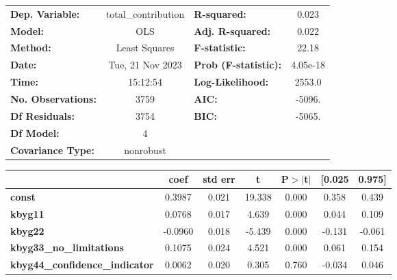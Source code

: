 \begin{center}
\begin{tabular}{lclc}
\toprule
\textbf{Dep. Variable:}                & total\_contribution & \textbf{  R-squared:         } &     0.023   \\
\textbf{Model:}                        &         OLS         & \textbf{  Adj. R-squared:    } &     0.022   \\
\textbf{Method:}                       &    Least Squares    & \textbf{  F-statistic:       } &     22.18   \\
\textbf{Date:}                         &   Tue, 21 Nov 2023  & \textbf{  Prob (F-statistic):} &  4.05e-18   \\
\textbf{Time:}                         &       15:12:54      & \textbf{  Log-Likelihood:    } &    2553.0   \\
\textbf{No. Observations:}             &          3759       & \textbf{  AIC:               } &    -5096.   \\
\textbf{Df Residuals:}                 &          3754       & \textbf{  BIC:               } &    -5065.   \\
\textbf{Df Model:}                     &             4       & \textbf{                     } &             \\
\textbf{Covariance Type:}              &      nonrobust      & \textbf{                     } &             \\
\bottomrule
\end{tabular}
\begin{tabular}{lcccccc}
                                       & \textbf{coef} & \textbf{std err} & \textbf{t} & \textbf{P$> |$t$|$} & \textbf{[0.025} & \textbf{0.975]}  \\
\midrule
\textbf{const}                         &       0.3987  &        0.021     &    19.338  &         0.000        &        0.358    &        0.439     \\
\textbf{kbyg11}                        &       0.0768  &        0.017     &     4.639  &         0.000        &        0.044    &        0.109     \\
\textbf{kbyg22}                        &      -0.0960  &        0.018     &    -5.439  &         0.000        &       -0.131    &       -0.061     \\
\textbf{kbyg33\_no\_limitations}       &       0.1075  &        0.024     &     4.521  &         0.000        &        0.061    &        0.154     \\
\textbf{kbyg44\_confidence\_indicator} &       0.0062  &        0.020     &     0.305  &         0.760        &       -0.034    &        0.046     \\

\end{tabular}
\end{center}
